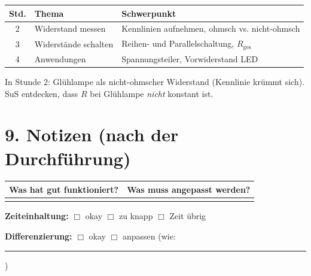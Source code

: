\documentclass[11pt, a4paper]{article}
\begin{document}
\begin{tabular}{|c|l|l|}
\hline
\textbf{Std.} & \textbf{Thema} & \textbf{Schwerpunkt} \\
\hline
2 & Widerstand messen & Kennlinien aufnehmen, ohmsch vs. nicht-ohmsch \\
\hline
3 & Widerstände schalten & Reihen- und Parallelschaltung, $R_{\text{ges}}$ \\
\hline
4 & Anwendungen & Spannungsteiler, Vorwiderstand LED \\
\hline
\end{tabular}

\vspace{1em}

\begin{tippbox}
In Stunde 2: Glühlampe als nicht-ohmscher Widerstand (Kennlinie krümmt sich).
SuS entdecken, dass $R$ bei Glühlampe \textit{nicht} konstant ist.
\end{tippbox}


\section*{9. Notizen (nach der Durchführung)}

\begin{tabular}{|p{7cm}|p{7cm}|}
\hline
\textbf{Was hat gut funktioniert?} & \textbf{Was muss angepasst werden?} \\
\hline
& \\[3cm]
\hline
\end{tabular}

\vspace{1em}

\textbf{Zeiteinhaltung:} $\Box$ okay \quad $\Box$ zu knapp \quad $\Box$ Zeit übrig

\textbf{Differenzierung:} $\Box$ okay \quad $\Box$ anpassen (wie: \rule{5cm}{0.4pt})

\end{document}

